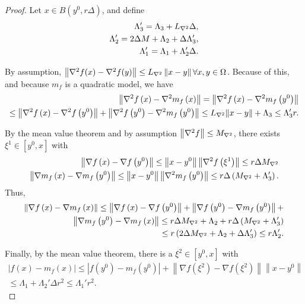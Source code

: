\begin{proof}
Let $x \in B\left(y^{0}, r\Delta\right)$, and define
\begin{align*}
\Lambda_3' = \Lambda_3 + {L_{\nabla^2}} \Delta, \\
\Lambda_2' = 2 \Delta M + \Lambda_2 +  \Delta \Lambda_3',\\
\Lambda_1' = \Lambda_1 + \Lambda_2' \Delta.
\end{align*}

By assumption, $\left\|\nabla^2 f(x) - \nabla^2 f(y)\right\| \le {L_{\nabla^2}}\left\|x-y\right\| \forall x,y \in \Omega$.
Because of this, and because $m_f$ is a quadratic model, we have
\begin{align*}
\left\| \nabla^2 f\left(x\right) - \nabla^2 m_f\left(x\right)\right\|
= \left\| \nabla^2 f\left(x\right) - \nabla^2 m_f\left(y^0\right)\right\| \\
\le \left\| \nabla^2 f\left(x\right) - \nabla^2 f\left(y^0\right)\right\| + \left\| \nabla^2 f\left(y^0\right) - \nabla^2 m_f\left(y^0\right)\right\|
\le {L_{\nabla^2}} \|x - y\| + \Lambda_3 \le  \Lambda_3' r .
\end{align*}

By the mean value theorem and by assumption $\left\|\nabla^2 f\right\| \le {M_{\nabla^2}}$, there exists $\xi^1 \in [y^0, x]$ with
\begin{align*}
\left\|\nabla f\left(x\right) - \nabla f\left(y^0\right) \right\|
\le \left\|x - y^0\right\| \left\| \nabla^2 f\left(\xi^1\right) \right\|
\le r \Delta {M_{\nabla^2}} \\
\left\|\nabla m_f\left(x\right) - \nabla m_f\left(y^0\right) \right\|
\le \left\|x - y^0\right\| \left\| \nabla^2 m_f\left(y^0\right) \right\|
\le r \Delta \left({M_{\nabla^2}} + \Lambda_3'\right).
\end{align*}
Thus, 
\begin{align*}
\left\|\nabla f\left(x\right) - \nabla m_f\left(x\right)\right\| \le 
\left\| \nabla f\left(x\right) - \nabla f\left(y^0\right) \right\| +
\left\|\nabla f\left(y^0\right) - \nabla m_f\left(y^0\right)\right\| + \\ \left\|\nabla m_f\left(y^0\right) - \nabla m_f\left(x\right)\right\|
\le r \Delta {M_{\nabla^2}} + \Lambda_2 + r \Delta \left({M_{\nabla^2}} + \Lambda_3'\right) \\
\le r \left(2 \Delta {M_{\nabla^2}} + \Lambda_2 +  \Delta \Lambda_3'\right)
\le r \Lambda_2'.
\end{align*}

Finally, by the mean value theorem, there is a $\xi^2 \in [y^0, x]$ with
\begin{align*}
\left|f(x) - m_f(x)\right|
\le \left| f(y^0) - m_f(y^0) \right| + \left\| \nabla f(\xi^2) - \nabla f(\xi^2) \right\| \left\|x - y^0\right\| \\
\le \Lambda_1 + \Lambda_2' \Delta r^2
\le \Lambda_1' r^2.
\end{align*}

\end{proof}
